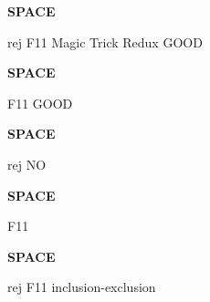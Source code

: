 \documentclass[quiz]{mcs}
\renewcommand{\examspace}{\textbf{SPACE}\newline}
\begin{document}

\examspace 

\begin{editingnotes}rej F11 Magic Trick Redux GOOD\end{editingnotes}


\iffalse
\examspace %
\begin{editingnotes}rej F11 \end{editingnotes}

  \pinput[points = 3, title = \textbf{bipartite matching sex}]{FP_bipartite_matching_sex}
\fi


\examspace
\begin{editingnotes}F11 GOOD\end{editingnotes}



\examspace %
\begin{editingnotes}rej NO \end{editingnotes}


\iffalse
\examspace
\begin{editingnotes}rej F11 Stable Matching\end{editingnotes}

  \pinput[points = 10, title= \textbf{marriage modify}]{FP_marriage_modify}
\fi

\examspace
\begin{editingnotes}F11\end{editingnotes}

\iffalse
\examspace 
\begin{editingnotes}F11 not used? perturbed F11 CP MAYBE\end{editingnotes}

  \pinput[points = 6, title = \textbf{big o}]{FP_big_o}
\fi

\examspace 
\begin{editingnotes}rej F11 inclusion-exclusion\end{editingnotes}

\end{document}
